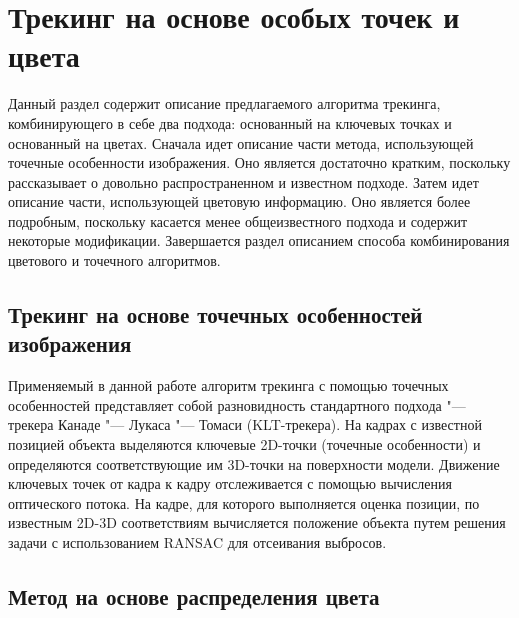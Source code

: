 \section{Трекинг на основе особых точек и цвета}\label{tracking}

Данный раздел содержит описание предлагаемого алгоритма трекинга,
комбинирующего в себе два подхода: основанный на ключевых точках
и основанный на цветах.
Сначала идет описание части метода, использующей точечные особенности
изображения.
Оно является достаточно кратким, поскольку рассказывает о довольно
распространенном и известном подходе.
Затем идет описание части, использующей цветовую информацию.
Оно является более подробным, поскольку касается менее общеизвестного
подхода и содержит некоторые модификации.
Завершается раздел описанием способа комбинирования цветового и точечного
алгоритмов.

\subsection{Трекинг на основе точечных особенностей изображения}
\label{subs:feat_tracking}

Применяемый в данной работе алгоритм трекинга с помощью точечных особенностей
представляет собой разновидность стандартного подхода "--- трекера
Канаде "--- Лукаса "--- Томаси
(KLT-трекера)\cite{LucasAndKanade,TomasiAndKanade,ShiAndTomasi,PyrLK}.
На кадрах с известной позицией объекта выделяются ключевые 2D-точки (точечные
особенности) и определяются соответствующие им 3D-точки на поверхности модели.
Движение ключевых точек от кадра к кадру отслеживается с помощью вычисления
оптического потока.
На кадре, для которого выполняется оценка позиции, по известным 2D-3D
соответствиям вычисляется положение объекта путем решения задачи
\PnP\cite{LepetitSurvey} с использованием RANSAC\cite{RANSAC} для отсеивания
выбросов.


\subsection{Метод на основе распределения цвета}


\newcommand{\Hf}{\ensuremath{H_f}}
\newcommand{\Hb}{\ensuremath{H_b}}
\newcommand{\uvec}{\ensuremath{\vect{u}}}
\newcommand{\hedist}{\ensuremath{\HeX{\CDistX{\uvec}}}}
\newcommand{\HistLocal}{\ensuremath{H_i}}
\newcommand{\HistLocalFg}{\ensuremath{{\Hf}_i}}
\newcommand{\HistLocalBg}{\ensuremath{{\Hb}_i}}

